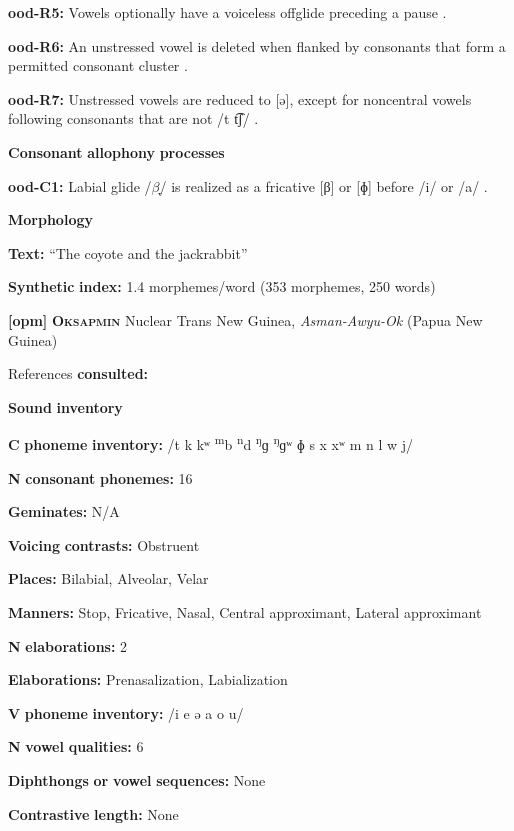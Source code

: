 \begin{styleBody}
\textbf{ood-R5:} Vowels optionally have a voiceless offglide preceding a pause \citep[31]{Saxton1963}.

\textbf{ood-R6:} An unstressed vowel is deleted when flanked by consonants that form a permitted consonant cluster \citep[103]{Saxton1982}.

\textbf{ood-R7:} Unstressed vowels are reduced to [ə], except for noncentral vowels following consonants that are not /t t͡ʃ/ \citep[104]{Saxton1982}.

\textbf{Consonant} \textbf{allophony} \textbf{processes}

\textbf{ood-C1:} Labial glide /$\beta ̞$/ is realized as a fricative [β] or [ɸ] before /i/ or /a/ \citep[31]{Saxton1963}.

\textbf{Morphology}

\textbf{Text:} “The coyote and the jackrabbit” \citep[263-266]{Saxton1982}

\textbf{Synthetic} \textbf{index:} 1.4 morphemes/word (353 morphemes, 250 words)

\textbf{[opm]}   \textbf{\textsc{Oksapmin}}  Nuclear Trans New Guinea, \textit{Asman-Awyu-Ok} (Papua New Guinea)

References \textbf{consulted:} \citet{Loughnane2009}

\textbf{Sound} \textbf{inventory}

\textbf{C} \textbf{phoneme} \textbf{inventory:} /t k kʷ \textsuperscript{m}b \textsuperscript{n}d \textsuperscript{ŋ}ɡ \textsuperscript{ŋ}ɡʷ ɸ s x xʷ m n l w j/

\textbf{N} \textbf{consonant} \textbf{phonemes:} 16

\textbf{Geminates:} N/A

\textbf{Voicing} \textbf{contrasts:} Obstruent

\textbf{Places:} Bilabial, Alveolar, Velar

\textbf{Manners:} Stop, Fricative, Nasal, Central approximant, Lateral approximant

\textbf{N} \textbf{elaborations:} 2

\textbf{Elaborations:} Prenasalization, Labialization

\textbf{V} \textbf{phoneme} \textbf{inventory:} /i e ə a o u/

\textbf{N} \textbf{vowel} \textbf{qualities:} 6

\textbf{Diphthongs} \textbf{or} \textbf{vowel} \textbf{sequences:} None

\textbf{Contrastive} \textbf{length:} None


\end{styleBody}
